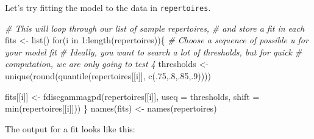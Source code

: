 \documentclass[]{article}
\newcommand{\hlnum}[1]{\textcolor[rgb]{0.816,0.125,0.439}{#1}}%
\newcommand{\hlstr}[1]{\textcolor[rgb]{0.251,0.627,0.251}{#1}}%
\newcommand{\hlcom}[1]{\textcolor[rgb]{0.502,0.502,0.502}{\textit{#1}}}%
\newcommand{\hlstd}[1]{\textcolor[rgb]{0.251,0.251,0.251}{#1}}%
\newcommand{\hlkwc}[1]{\textcolor[rgb]{0.251,0.251,0.251}{#1}}%
\newcommand{\hlkwd}[1]{\textcolor[rgb]{0.878,0.439,0.125}{#1}}%
\newenvironment{Shaded}{\begin{myshaded}}{\end{myshaded}}
\newcommand{\KeywordTok}[1]{\hlkwd{#1}}
\newcommand{\DataTypeTok}[1]{\hlkwc{#1}}
\newcommand{\DecValTok}[1]{\hlnum{#1}}
\newcommand{\StringTok}[1]{\hlstr{#1}}
\newcommand{\CommentTok}[1]{\hlcom{#1}}
\newcommand{\NormalTok}[1]{\hlstd{#1}}
\theoremstyle{definition}
\theoremstyle{definition}
\theoremstyle{definition}
\theoremstyle{remark}
\begin{document}
Let's try fitting the model to the data in \texttt{repertoires}.

\begin{Shaded}
\begin{Highlighting}[]
\CommentTok{# This will loop through our list of sample repertoires,}
\CommentTok{# and store a fit in each}
\NormalTok{fits <-}\StringTok{ }\KeywordTok{list}\NormalTok{()}
\NormalTok{for(i in }\DecValTok{1}\NormalTok{:}\KeywordTok{length}\NormalTok{(repertoires))\{}
    \CommentTok{# Choose a sequence of possible u for your model fit}
    \CommentTok{# Ideally, you want to search a lot of thresholds, but for quick}
    \CommentTok{# computation, we are only going to test 4}
    \NormalTok{thresholds <-}\StringTok{ }\KeywordTok{unique}\NormalTok{(}\KeywordTok{round}\NormalTok{(}\KeywordTok{quantile}\NormalTok{(repertoires[[i]], }\KeywordTok{c}\NormalTok{(.}\DecValTok{75}\NormalTok{,.}\DecValTok{8}\NormalTok{,.}\DecValTok{85}\NormalTok{,.}\DecValTok{9}\NormalTok{))))}
    
    \NormalTok{fits[[i]] <-}\StringTok{ }\KeywordTok{fdiscgammagpd}\NormalTok{(repertoires[[i]], }\DataTypeTok{useq =} \NormalTok{thresholds,}
                               \DataTypeTok{shift =} \KeywordTok{min}\NormalTok{(repertoires[[i]]))}
\NormalTok{\}}
\KeywordTok{names}\NormalTok{(fits) <-}\StringTok{ }\KeywordTok{names}\NormalTok{(repertoires)}
\end{Highlighting}
\end{Shaded}

The output for a fit looks like this:
\end{document}
